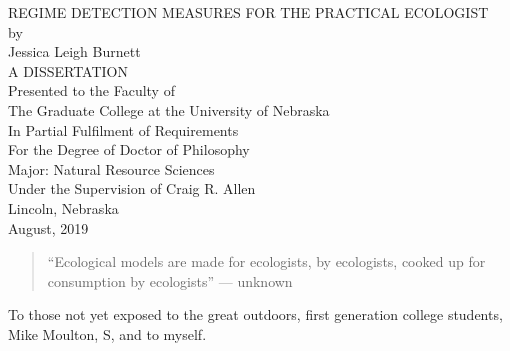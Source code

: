 \documentclass[12pt,twoside,openany]{reedthesis}
\renewcommand{\maketitle}{%
\begin{center}%
\MakeUppercase{Regime Detection Measures for the Practical Ecologist}\\[1\baselineskip]
\singlespacing
by\\[2\baselineskip]
Jessica Leigh Burnett\\[4\baselineskip]
\MakeUppercase{A Dissertation}\\[4\baselineskip]
Presented to the Faculty of\\[\baselineskip]
The Graduate  College at the University of Nebraska\\[\baselineskip]
In Partial Fulfilment of Requirements\\[\baselineskip]
For the Degree of Doctor of Philosophy\\[3\baselineskip]
Major: Natural Resource Sciences \\[3\baselineskip]
Under the Supervision of Craig R. Allen\\[3\baselineskip]
Lincoln, Nebraska\\[1\baselineskip]
August, 2019
\end{center}
\thispagestyle{empty}
\cleardoublepage
}
\begin{document}
  \maketitle

\frontmatter %
\pagestyle{empty} %
  \begin{preface}
    \begin{quote}
    ``Ecological models are made for ecologists, by ecologists, cooked up for consumption by ecologists'' --- unknown
    \end{quote}
  \end{preface}
 \begin{dedication}
   To those not yet exposed to the great outdoors, first generation college students, Mike Moulton, S, and to myself.
 \end{dedication}
\end{document}
